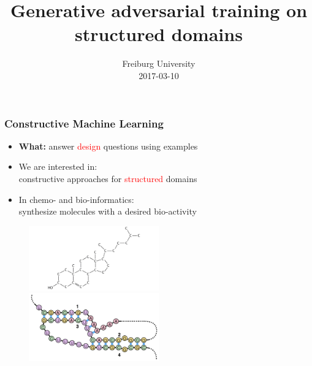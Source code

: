 \documentclass{beamer}
\title 
{Generative adversarial training on \\ structured domains}
\author %
{\underline{Stefan Mautner} \and Fabrizio Costa 
    \small{ 
        \texttt{
            \href{mailto:mautner@informatik.uni-freiburg.de}
            {mautner@informatik.uni-freiburg.de}
        }
        \texttt{
            \href{mailto:f.costa@exeter.ac.uk}
            {f.costa@exeter.ac.uk}
        }
   }
}
\date 
{Freiburg University \\2017-03-10}
\newcommand{\red}[1]{\textcolor{red}{#1}}
\begin{document}
\frame{\titlepage}



\begin{frame}
\frametitle{Constructive Machine Learning}

    \begin{itemize}
        \item {\bf What:} answer \red{design} questions using examples
        \item We are interested in: \\
        constructive approaches for \red{structured} domains
        \item In chemo- and bio-informatics: \\
        synthesize molecules with a desired bio-activity
    \end{itemize}
    \begin{figure}
        \centering
        \includegraphics[width=0.5\textwidth]{images/mol.jpg}
        \includegraphics[width=0.5\textwidth]{images/rna.png}
    \end{figure}    
\end{frame}




\end{document}
